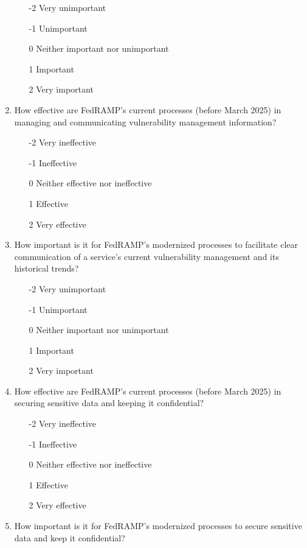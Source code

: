 \documentclass{jdf}
\begin{document}
\begin{enumerate}
    \begin{enumerate}
        \item [-2] Very unimportant
        \item [-1] Unimportant
        \item  [0] Neither important nor unimportant
        \item  [1] Important
        \item  [2] Very important
    \end{enumerate}
    \item How effective are FedRAMP's current processes (before March 2025) in managing and communicating vulnerability management information?
    \begin{enumerate}
        \item [-2] Very ineffective
        \item [-1] Ineffective
        \item  [0] Neither effective nor ineffective
        \item  [1] Effective 
        \item  [2] Very effective
    \end{enumerate}
    \item How important is it for FedRAMP's modernized processes to facilitate clear communication of a service's current vulnerability management and its historical trends?
    \begin{enumerate}
        \item [-2] Very unimportant
        \item [-1] Unimportant
        \item  [0] Neither important nor unimportant
        \item  [1] Important
        \item  [2] Very important
    \end{enumerate}
    \item How effective are FedRAMP's current processes (before March 2025) in securing sensitive data and keeping it confidential?
    \begin{enumerate}
        \item [-2] Very ineffective
        \item [-1] Ineffective
        \item  [0] Neither effective nor ineffective
        \item  [1] Effective 
        \item  [2] Very effective
    \end{enumerate}
    \item How important is it for FedRAMP's modernized processes to secure sensitive data and keep it confidential?

\end{enumerate}
\end{document}
